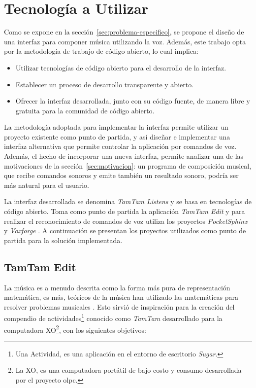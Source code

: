 
\section{Tecnolog\'ia a Utilizar}
\label{sec:tecnologia-utilizada}

Como se expone en la secci\'on~\ref{sec:problema-especifico}, se propone el dise\~no
de una interfaz para componer m\'usica utilizando la voz. Adem\'as, este trabajo 
opta por la metodolog\'ia de trabajo de c\'odigo abierto, lo cual implica: 

\begin{itemize}
    \item Utilizar tecnolog\'ias de c\'odigo abierto para el desarrollo de la interfaz.
    \item Establecer un proceso de desarrollo transparente y abierto.
    \item Ofrecer la interfaz desarrollada, junto con su c\'odigo fuente, de manera libre 
        y gratuita para la comunidad de c\'odigo abierto.
\end{itemize}

La metodolog\'ia adoptada para implementar la interfaz permite utilizar un proyecto
existente como punto de partida, y as\'i dise\~nar e implementar una interfaz alternativa que permite
controlar la aplicaci\'on por comandos de voz. Adem\'as,
el hecho de incorporar una nueva interfaz, permite analizar
una de las motivaciones de la secci\'on~\ref{sec:motivacion}: un programa de composici\'on
musical, que recibe comandos sonoros y emite tambi\'en un resultado sonoro, podr\'ia ser
m\'as natural para el usuario. 

La interfaz desarrollada se denomina \emph{TamTam Listens} y se basa en tecnolog\'ias de c\'odigo abierto.
Toma como punto de partida la aplicaci\'on \emph{TamTam Edit} y para realizar el reconocimiento 
de comandos de voz utiliza los proyectos \emph{PocketSphinx} \cite{PocketSphinxHomePage} 
y \emph{Voxforge} \cite{Voxforge}.  A continuaci\'on se presentan los proyectos
utilizados como punto de partida para la soluci\'on implementada.

\subsection{TamTam Edit}
\label{sec:tamtam-edit}

La m\'usica es a menudo descrita como la forma m\'as pura de representaci\'on matem\'atica, es m\'as,
te\'oricos de la m\'usica han utilizado las matem\'aticas para resolver problemas musicales
\cite{TheSoundOfNumbers}. Esto sirvi\'o de inspiraci\'on para la creaci\'on del compendio de 
actividades\footnote{Una Actividad, es una aplicaci\'on en el entorno de escritorio \emph{Sugar}.}
conocido como \emph{TamTam} desarrollado para la computadora XO\footnote{La XO, es una computadora 
port\'atil de bajo costo y consumo desarrollada por el proyecto \gls{olpc}.},
con los siguientes objetivos:

